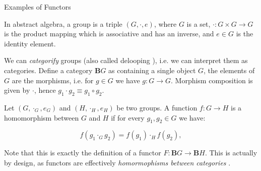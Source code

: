 \documentclass[aspectratio=169,xcolor=dvipsnames,10pt]{beamer}
\theoremstyle{definition}
\begin{document}
\begin{frame}[fragile]{Examples of Functors}
    \begin{definition}
    In abstract algebra, a group is a triple $(G, \cdot, e)$, where $G$ is a set,
    $\cdot : G \times G \to G$ is the product mapping which is associative and has an inverse,
    and $e \in G$ is the identity element.

	\vspace{3mm}
    We can \textit{categorify} groups (also called delooping \citep{perrone2024starting}),
    i.e. we can interpret them as categories. Define a category $\mathbf B G$ as containing a single
    object $G$, the elements of $G$ are the morphisms, i.e. for $g \in G$ we have $g:G\to G$.
    Morphism composition is given by $\cdot$, hence $g_1 \cdot g_2 \equiv g_1 \circ g_2$.

	\vspace{3mm}
    Let $(G, \cdot_G, e_G)$ and $(H, \cdot_H, e_H)$ be two groups. A function
    $f:G \to H$ is a homomorphism between $G$ and $H$ if 
    for every $g_1, g_2 \in G$ we have:

    $$f(g_1 \cdot_G g_2) = f(g_1) \cdot_H f(g_2),$$

    Note that this is exactly the definition of a functor $F:\mathbf B G \to \mathbf B H$.
    This is actually by design, as functors are effectively \textit{homormophisms between categories}
    \citep{ncatlabfunctor}.
    \end{definition}
\end{frame}


\end{document}
